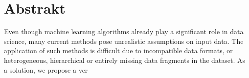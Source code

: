 \vspace*{\fill}
\section*{Abstrakt}
Even though machine learning algorithms already play a significant role in data science, many current
methods pose unrealistic assumptions on input data. The application of such methods is difficult due
to incompatible data formats, or heterogeneous, hierarchical or entirely missing data fragments in the
dataset. As a solution, we propose a ver
\vspace*{\fill}